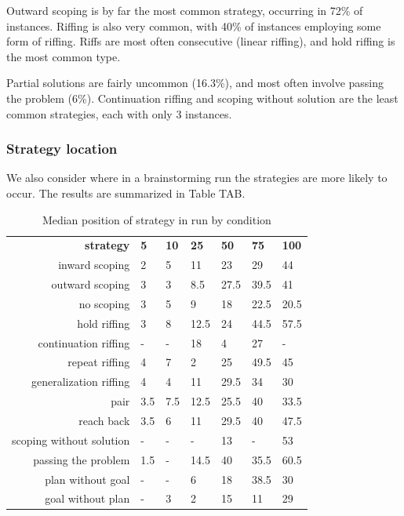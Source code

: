 Outward scoping is by far the most common strategy, occurring in 72\% of instances. Riffing is also very common, with 40\% of instances employing some form of riffing. Riffs are most often consecutive (linear riffing), and hold riffing is the most common type.

Partial solutions are fairly uncommon (16.3\%), and most often involve passing the problem (6\%). Continuation riffing and scoping without solution are the least common strategies, each with only 3 instances.

\subsubsection{Strategy location}

We also consider where in a brainstorming run the strategies are more likely to occur. The results are summarized in Table TAB.

\begin{table}
    \begin{tabular}{r | l l l l l l}
        \textbf{strategy} & \textbf{5} & \textbf{10} & \textbf{25} & \textbf{50} & \textbf{75} & \textbf{100} \\
        inward scoping & 2 & 5 & 11 & 23 & 29 & 44 \\
        outward scoping & 3 & 3 & 8.5 & 27.5 & 39.5 & 41 \\
        no scoping & 3 & 5 & 9 & 18 & 22.5 & 20.5 \\
        \hline \hline
        hold riffing & 3 & 8 & 12.5 & 24 & 44.5 & 57.5 \\
        continuation riffing & - & - & 18 & 4 & 27 & - \\
        repeat riffing & 4 & 7 & 2 & 25 & 49.5 & 45 \\
        generalization riffing & 4 & 4 & 11 & 29.5 & 34 & 30 \\
        \hline
        pair & 3.5 & 7.5 & 12.5 & 25.5 & 40 & 33.5 \\
        reach back & 3.5 & 6 & 11 &29.5 & 40 & 47.5 \\
        \hline \hline
        scoping without solution & - & - & - & 13 & - & 53 \\
        passing the problem & 1.5 & - & 14.5 & 40 & 35.5 & 60.5  \\
        plan without goal & - & - & 6 & 18 & 38.5 & 30 \\
        goal without plan & - & 3 & 2 & 15 & 11 & 29 \\ 
    \end{tabular}
    \caption{Median position of strategy in run by condition}
\end{table}

